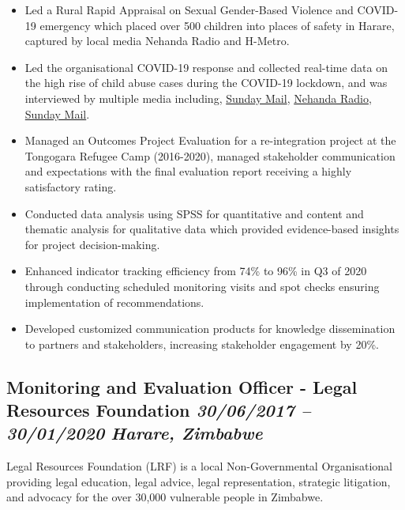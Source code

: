 \documentclass[
  10pt,
]{article}
\providecommand{\tightlist}{%
  \setlength{\itemsep}{0pt}\setlength{\parskip}{0pt}}
\begin{document}
\begin{itemize}
\tightlist
\item
Led a Rural Rapid Appraisal on Sexual Gender-Based Violence and COVID-19 emergency which placed over 500 children into places of safety in Harare, captured by local media Nehanda Radio and H-Metro.
\item
Led the organisational COVID-19 response and collected real-time data on the high rise of child abuse cases during the COVID-19 lockdown, and was interviewed by multiple media including, \href{https://www.sundaymail.co.zw/is-your-child-safe-shocking-rise-in-child-abuse-cases}{Sunday Mail}, \href{https://nehandaradio.com/2020/04/17/62-children-removed-from-the-streets/}{Nehanda Radio}, \href{https://www.sundaymail.co.zw/school-misdemeanours-tip-of-the-iceberg}{Sunday Mail}.
\item
Managed an Outcomes Project Evaluation for a re-integration project at the Tongogara Refugee Camp (2016-2020), managed stakeholder communication and expectations with the final evaluation report receiving a highly satisfactory rating.
\item
Conducted data analysis using SPSS for quantitative and content and thematic analysis for qualitative data which provided evidence-based insights for project decision-making.
\item
Enhanced indicator tracking efficiency from 74\% to 96\% in Q3 of 2020 through conducting scheduled monitoring visits and spot checks ensuring implementation of recommendations.
\item
Developed customized communication products for knowledge dissemination to partners and stakeholders, increasing stakeholder engagement by 20\%.
\end{itemize}

\subsection{\texorpdfstring{Monitoring and Evaluation Officer - Legal Resources Foundation \emph{30/06/2017 -- 30/01/2020} \textbar{} \emph{Harare, Zimbabwe}}{Monitoring and Evaluation Officer - Legal Resources Foundation 30/06/2017 -- 30/01/2020 \textbar{} Harare, Zimbabwe}}\label{monitoring-and-evaluation-officer---legal-resources-foundation-30062017-30012020-harare-zimbabwe}

Legal Resources Foundation (LRF) is a local Non-Governmental Organisational providing legal education, legal advice, legal representation, strategic litigation, and advocacy for the over 30,000 vulnerable people in Zimbabwe.
\end{document}
